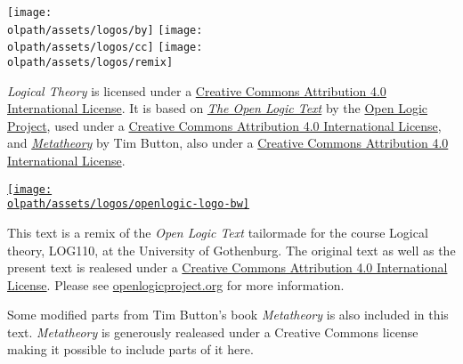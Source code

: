 \documentclass[a4paper]{memoir}
\newcommand{\olpath}{../../}
\begin{document}

\begin{titlingpage}

\vfill

\begin{minipage}[b]{.9cm}
\texttt{[image: \\olpath/assets/logos/by]}
\texttt{[image: \\olpath/assets/logos/cc]}
\texttt{[image: \\olpath/assets/logos/remix]}
\end{minipage}
\hspace{.3cm}
\begin{minipage}[b]{6.5cm}
\ollicensefont
\textit{Logical Theory} is licensed under a
\href{http://creativecommons.org/licenses/by/4.0/}{Creative Commons
  Attribution 4.0 International License}. It is based on
\textit{\href{https://github.com/OpenLogicProject/OpenLogic}{The Open
    Logic Text}} by the \href{http://openlogicproject.org/}{Open Logic
  Project}, used under a
\href{http://creativecommons.org/licenses/by/4.0/}{Creative Commons
  Attribution 4.0 International License}, and \textit{\href{http://people.ds.cam.ac.uk/tecb2/metatheory.shtml}{Metatheory}} by Tim Button, also under a \href{http://creativecommons.org/licenses/by/4.0/}{Creative Commons
  Attribution 4.0 International License}.
\end{minipage}
\hfill
\href{http://openlogicproject.org/}{\texttt{[image: \\olpath/assets/logos/openlogic-logo-bw]}}


\end{titlingpage}

\frontmatter
\pagestyle{ruled}

\thispagestyle{empty}%
\noindent This text is a remix of the \textit{Open Logic Text} tailormade for the course Logical theory, LOG110, at the University of Gothenburg. The original text as well as the present text is realesed under a \href{http://creativecommons.org/licenses/by/4.0/}{Creative Commons
  Attribution 4.0 International License}. Please see \href{http://openlogicproject.org/}{openlogicproject.org} for
more information. 

Some modified parts from Tim Button's book \textit{Metatheory} is also included in this text. \textit{Metatheory} is generously realeased under a Creative Commons license making it possible to include parts of it here.
\end{document}
